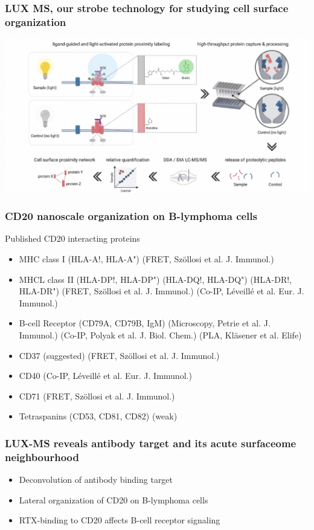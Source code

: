 \begin{itemize}
\begin{itemize}
\subsubsection{LUX MS, our strobe technology for studying cell surface organization}
\includegraphics[width=1\textwidth]{Images/LUZ.png}\\[1cm]
\subsubsection{CD20 nanoscale organization on B-lymphoma cells}
Published CD20 interacting proteins
\begin{itemize}
    \item  MHC class I
(HLA-A!, HLA-A")
(FRET, Szöllosi et al. J. Immunol.)
\item MHCL class II
(HLA-DP!, HLA-DP")
(HLA-DQ!, HLA-DQ")
(HLA-DR!, HLA-DR")
(FRET, Szöllosi et al. J. Immunol.)
(Co-IP, Léveillé et al. Eur. J. Immunol.)
\item B-cell Receptor (CD79A, CD79B, IgM)
(Microscopy, Petrie et al. J. Immunol.)
(Co-IP, Polyak et al. J. Biol. Chem.)
(PLA, Kläsener et al. Elife)
\item  CD37 (suggested)
(FRET, Szöllosi et al. J. Immunol.)
\item CD40
(Co-IP, Léveillé et al. Eur. J. Immunol.)
\item CD71
(FRET, Szöllosi et al. J. Immunol.)
\item Tetraspanins (CD53, CD81, CD82) (weak)
\end{itemize}

\subsubsection{LUX-MS reveals antibody target and its acute surfaceome neighbourhood}
\begin{itemize}
    \item Deconvolution of antibody binding target
\item Lateral organization of CD20 on B-lymphoma cells
\item RTX-binding to CD20 affects B-cell receptor signaling 
\end{itemize}


\end{itemize}
\end{itemize}
